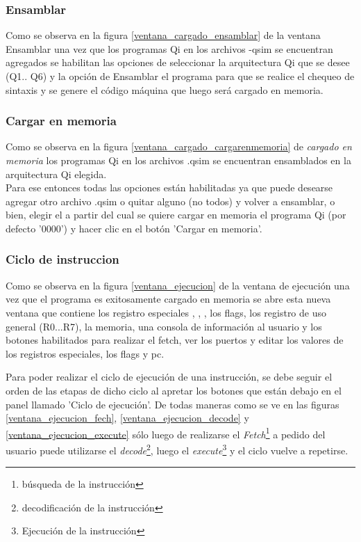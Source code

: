 \subsubsection{Ensamblar}
Como se observa en la figura \ref{ventana_cargado_ensamblar} de la ventana Ensamblar una vez que los programas Qi en los archivos -qsim se encuentran agregados se habilitan las opciones de seleccionar la arquitectura Qi que se desee (Q1.. Q6) y la opción de Ensamblar el programa para que se realice el chequeo de sintaxis y se genere el código máquina que luego será cargado en memoria.


\subsubsection{Cargar en memoria}
Como se observa en la figura \ref{ventana_cargado_cargarenmemoria} de \textit{cargado en memoria} los programas Qi en los archivos .qsim se encuentran ensamblados en la arquitectura Qi elegida.\\
Para ese entonces todas las opciones están habilitadas ya que puede desearse agregar otro archivo .qsim o quitar alguno (no todos) y volver a ensamblar, o bien, elegir el \PC a partir del cual se quiere cargar en memoria el programa Qi (por defecto '0000') y hacer clic en el botón 'Cargar en memoria'.

\subsubsection{Ciclo de instruccion}
Como se observa en la figura \ref{ventana_ejecucion} de la ventana de ejecución una vez que el programa es exitosamente cargado en memoria se abre esta nueva ventana que contiene los registro especiales \PC, \IR, \SP, los flags, los registro de uso general (R0...R7), la memoria, una consola de información al usuario y los botones habilitados para realizar el fetch, ver los puertos y editar los valores de los registros especiales, los flags y pc.


Para poder realizar el ciclo de ejecución de una instrucción, se debe seguir el orden de las etapas de dicho ciclo al apretar los botones que están debajo en el panel llamado 'Ciclo de ejecución'. De todas maneras como se ve en las figuras \ref{ventana_ejecucion_fech}, \ref{ventana_ejecucion_decode} y \ref{ventana_ejecucion_execute} sólo luego de realizarse el \textit{Fetch}\footnote{búsqueda de la instrucción} a pedido del usuario puede utilizarse el \textit{decode}\footnote{decodificación de la instrucción}, luego el \textit{execute}\footnote{Ejecución de la instrucción} y el ciclo vuelve a repetirse.\\

